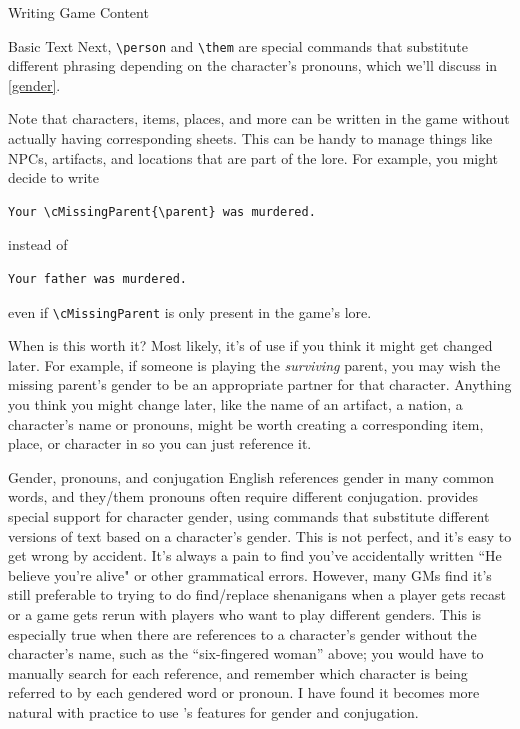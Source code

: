 \documentclass[sheet]{GameTexBase}
\begin{document}
\begin{section}{Writing Game Content}
\begin{subsection}{Basic \gametex{} Text}
Next, \lstinline{\person} and \lstinline{\them} are special \gametex{} commands that substitute different phrasing depending on the character's pronouns, which we'll discuss in \ref{gender}.

Note that characters, items, places, and more can be written in the game without actually having corresponding sheets.  This can be handy to manage things like NPCs, artifacts, and locations that are part of the lore.  For example, you might decide to write 
\begin{verbatim}
Your \cMissingParent{\parent} was murdered.
\end{verbatim}
instead of 
\begin{verbatim}
Your father was murdered.
\end{verbatim}
even if \lstinline|\cMissingParent| is only present in the game's lore.

When is this worth it?  Most likely, it's of use if you think it might get changed later.  For example, if someone is playing the \emph{surviving} parent, you may wish the missing parent's gender to be an appropriate partner for that character.  Anything you think you might change later, like the name of an artifact, a nation, a character's name or pronouns, might be worth creating a corresponding item, place, or character in \gametex{} so you can just reference it.

\end{subsection}
\begin{subsection}{Gender, pronouns, and conjugation}
\label{gender}
English references gender in many common words, and they/them pronouns often require different conjugation.  \gametex{} provides special support for character gender, using commands that substitute different versions of text based on a character's gender.  This is not perfect, and it's easy to get wrong by accident.  It's always a pain to find you've accidentally written ``He believe you're alive" or other grammatical errors.  However, many GMs find it's still preferable to trying to do find/replace shenanigans when a player gets recast or a game gets rerun with players who want to play different genders.  This is especially true when there are references to a character's gender without the character's name, such as the ``six-fingered woman'' above; you would have to manually search for each reference, and remember which character is being referred to by each gendered word or pronoun.  I have found it becomes more natural with practice to use \gametex{}'s features for gender and conjugation.


\end{subsection}
\end{section}
\end{document}
